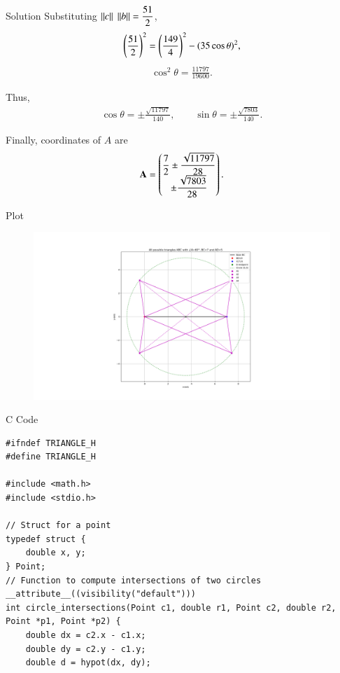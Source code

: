\documentclass{beamer}
\begin{document}
\begin{frame}{Solution}
    Substituting $\left\lVert c\right\rVert\;\left\lVert b\right\rVert=\dfrac{51}{2}$,
\begin{align}
\left(\dfrac{51}{2}\right)^2=\left(\dfrac{149}{4}\right)^2-(35\cos\theta)^2,
\end{align}
\begin{align}
\cos^2\theta=\frac{11797}{19600}.
\end{align}

Thus,
\begin{align}
\cos\theta=\pm\frac{\sqrt{11797}}{140},\qquad
\sin\theta=\pm\frac{\sqrt{7803}}{140}.
\end{align}

Finally, coordinates of $A$ are
\begin{align}
\mathbf{A}=\begin{pmatrix}
\dfrac{7}{2}\pm\dfrac{\sqrt{11797}}{28}\\ 
\pm\dfrac{\sqrt{7803}}{28}
\end{pmatrix}.
\end{align}
\end{frame}

\begin{frame}{Plot}
    \begin{figure}
        \centering
        \includegraphics[width=1\linewidth]{figs/plot6.png}
        \caption{}
        \label{fig:placeholder}
    \end{figure}
\end{frame}

\begin{frame}[fragile]{C Code}
    \begin{verbatim}
#ifndef TRIANGLE_H
#define TRIANGLE_H

#include <math.h>
#include <stdio.h>

// Struct for a point
typedef struct {
    double x, y;
} Point;
// Function to compute intersections of two circles
__attribute__((visibility("default")))
int circle_intersections(Point c1, double r1, Point c2, double r2, Point *p1, Point *p2) {
    double dx = c2.x - c1.x;
    double dy = c2.y - c1.y;
    double d = hypot(dx, dy);
    \end{verbatim}
\end{frame}
\end{document}
